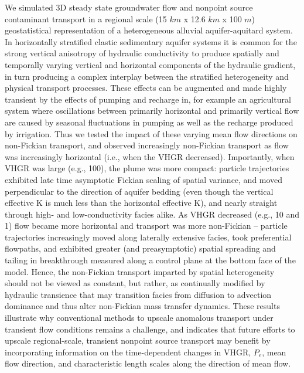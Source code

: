 We simulated 3D steady state groundwater flow and nonpoint source contaminant transport in a regional scale (15 $km$ x 12.6 $km$ x 100 $m$) geostatistical representation of a heterogeneous alluvial aquifer-aquitard system. In horizontally stratified clastic sedimentary aquifer systems it is common for the strong vertical anisotropy of hydraulic conductivity to produce spatially and temporally varying vertical and horizontal components of the hydraulic gradient, in turn producing a complex interplay between the stratified heterogeneity and physical transport processes. These effects can be augmented and made highly transient by the effects of pumping and recharge in, for example an agricultural system where oscillations between primarily horizontal and primarily vertical flow are caused by seasonal fluctuations in pumping as well as the recharge produced by irrigation. Thus we tested the impact of these varying mean flow directions on non-Fickian transport, and observed increasingly non-Fickian transport as flow was increasingly horizontal (i.e., when the VHGR decreased). Importantly, when VHGR was large (e.g., 100), the plume was more compact: particle trajectories exhibited late time asymptotic Fickian scaling of spatial variance, and moved perpendicular to the direction of aquifer bedding (even though the vertical effective K is much less than the horizontal effective K), and nearly straight through high- and low-conductivity facies alike. As VHGR decreased (e.g., 10 and 1) flow became more horizontal and transport was more non-Fickian -- particle trajectories increasingly moved along laterally extensive facies, took preferential flowpaths, and exhibited greater (and preasymptotic) spatial spreading and tailing in breakthrough measured along a control plane at the bottom face of the model. Hence, the non-Fickian transport imparted by spatial heterogeneity should not be viewed as constant, but rather, as continually modified by hydraulic transience that may transition facies from diffusion to advection dominance and thus alter non-Fickian mass transfer dynamics. These results illustrate why conventional methods to upscale anomalous transport under transient flow conditions remains a challenge, and indicates that future efforts to upscale regional-scale, transient nonpoint source transport may benefit by incorporating information on the time-dependent changes in VHGR, $P_e$, mean flow direction, and characteristic length scales along the direction of mean flow.



